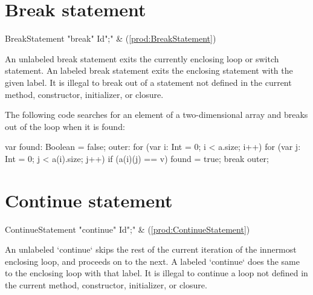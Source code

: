\section{Break statement}

\begin{bbgrammar}
      BreakStatement \: \xcd"break" Id\opt \xcd";" & (\ref{prod:BreakStatement}) \\
\end{bbgrammar}


An unlabeled break statement exits the currently enclosing loop or switch
statement. An labeled break statement exits the enclosing 
statement with the given label.
It is illegal to break out of a statement not defined in the current
method, constructor, initializer, or closure.  

\begin{ex}
The following code searches for an element of a two-dimensional
array and breaks out of the loop when it is found:
\begin{xten}
var found: Boolean = false;
outer: for (var i: Int = 0; i < a.size; i++)
    for (var j: Int = 0; j < a(i).size; j++)
        if (a(i)(j) == v) {
            found = true;
            break outer;
        }
\end{xten}
\end{ex}

\section{Continue statement}

\begin{bbgrammar}
   ContinueStatement \: \xcd"continue" Id\opt \xcd";" & (\ref{prod:ContinueStatement}) \\
\end{bbgrammar}
An unlabeled \xcd`continue` skips the rest of the current iteration of the
innermost enclosing loop, and proceeds on to the next.  A labeled
\xcd`continue` does the same to the enclosing loop with that label.
It is illegal to continue a loop not defined in the current
method, constructor, initializer, or closure.



